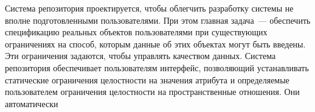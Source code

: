 \begin{multicols}{2}
      Система репозитория проектируется, чтобы облегчить разработку системы не 
вполне под\-го\-тов\-лен\-ны\-ми пользователями. При этом главная задача~--- обеспечить 
спецификацию реальных объектов пользователями при существующих ограничениях на 
способ, которым данные об этих объектах могут быть введены. Эти ограничения задаются, 
чтобы управлять качеством данных. Система репозитория обеспечивает пользователям 
интерфейс, позволяющий устанавливать статические ограничения целостности на значения 
атрибута и определяемые пользователем ограничения целостности на пространственные 
отношения. Они автоматически\linebreak\vspace*{-12pt}

\pagebreak

\end{multicols}

\begin{figure} %
 \vspace*{1pt}
 \begin{center}
 \mbox{%
 \epsfxsize=156.638mm
 }
 \end{center}
 \vspace*{-9pt}
\end{figure}

